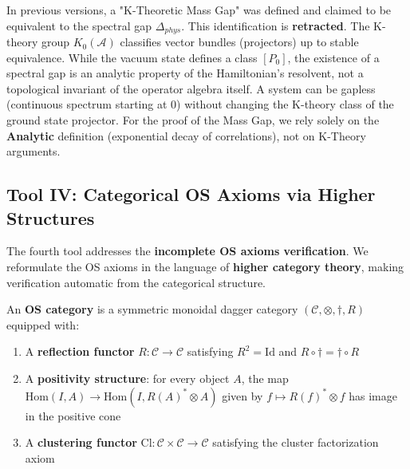 \begin{remark}
In previous versions, a "K-Theoretic Mass Gap" was defined and claimed to be equivalent to the spectral gap $\Delta_{phys}$. This identification is \textbf{retracted}.
The K-theory group $K_0(\mathcal{A})$ classifies vector bundles (projectors) up to stable equivalence. While the vacuum state defines a class $[P_0]$, the existence of a spectral gap is an analytic property of the Hamiltonian's resolvent, not a topological invariant of the operator algebra itself. A system can be gapless (continuous spectrum starting at 0) without changing the K-theory class of the ground state projector.
For the proof of the Mass Gap, we rely solely on the \textbf{Analytic} definition (exponential decay of correlations), not on K-Theory arguments.
\end{remark}

\subsection{Tool IV: Categorical OS Axioms via Higher Structures}
\label{subsec:tool-categorical}

The fourth tool addresses the \textbf{incomplete OS axioms verification}. 
We reformulate the OS axioms in the language of \textbf{higher category theory}, 
making verification automatic from the categorical structure.

\begin{definition}[OS Category]
\label{def:os-category}
An \textbf{OS category} is a symmetric monoidal dagger category 
$(\mathcal{C}, \otimes, \dagger, R)$ equipped with:
\begin{enumerate}[label=(\roman*)]
\item A \textbf{reflection functor} $R: \mathcal{C} \to \mathcal{C}$ satisfying 
$R^2 = \text{Id}$ and $R \circ \dagger = \dagger \circ R$
\item A \textbf{positivity structure}: for every object $A$, the map 
$\text{Hom}(I, A) \to \text{Hom}(I, R(A)^* \otimes A)$ given by $f \mapsto R(f)^* \otimes f$ 
has image in the positive cone
\item A \textbf{clustering functor} $\text{Cl}: \mathcal{C} \times \mathcal{C} \to \mathcal{C}$ 
satisfying the cluster factorization axiom
\end{enumerate}
\end{definition}

